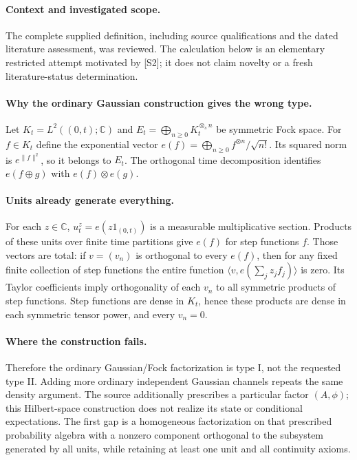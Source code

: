 \documentclass[11pt]{article}
\begin{document}
\paragraph{Context and investigated scope.} The complete supplied definition, including source qualifications and the dated literature assessment, was reviewed. The calculation below is an elementary restricted attempt motivated by [S2]; it does not claim novelty or a fresh literature-status determination.

\paragraph{Why the ordinary Gaussian construction gives the wrong type.} Let $K_t=L^2((0,t);\mathbb C)$ and $E_t=\bigoplus_{n\geq0}K_t^{\otimes_s n}$ be symmetric Fock space. For $f\in K_t$ define the exponential vector $e(f)=\bigoplus_{n\geq0}f^{\otimes n}/\sqrt{n!}$. Its squared norm is $e^{\|f\|^2}$, so it belongs to $E_t$. The orthogonal time decomposition identifies $e(f\oplus g)$ with $e(f)\otimes e(g)$.

\paragraph{Units already generate everything.} For each $z\in\mathbb C$, $u_t^z=e(z1_{(0,t)})$ is a measurable multiplicative section. Products of these units over finite time partitions give $e(f)$ for step functions $f$. Those vectors are total: if $v=(v_n)$ is orthogonal to every $e(f)$, then for any fixed finite collection of step functions the entire function $\langle v,e(\sum_jz_jf_j)\rangle$ is zero. Its Taylor coefficients imply orthogonality of each $v_n$ to all symmetric products of step functions. Step functions are dense in $K_t$, hence these products are dense in each symmetric tensor power, and every $v_n=0$.

\paragraph{Where the construction fails.} Therefore the ordinary Gaussian/Fock factorization is type I, not the requested type II. Adding more ordinary independent Gaussian channels repeats the same density argument. The source additionally prescribes a particular factor $(A,\phi)$; this Hilbert-space construction does not realize its state or conditional expectations. The first gap is a homogeneous factorization on that prescribed probability algebra with a nonzero component orthogonal to the subsystem generated by all units, while retaining at least one unit and all continuity axioms.
\end{document}
